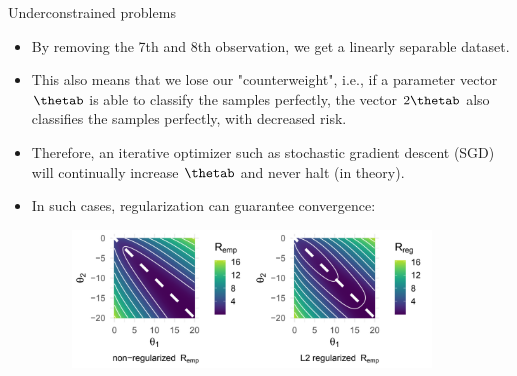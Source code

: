 \begin{vbframe} {Underconstrained problems}
\begin{footnotesize}
\begin{itemize}
\item By removing the 7th and 8th observation, we get a linearly separable dataset. \\
\item This also means that we lose our "counterweight", i.e., if a parameter vector $\thetab$ is able to classify the samples perfectly, the vector $2\thetab$ also classifies the samples perfectly, with decreased risk.
    \item Therefore, an iterative optimizer such as stochastic gradient descent (SGD) will continually increase $\thetab$ and never halt (in theory).
    \item In such cases, regularization can guarantee convergence: 
    
    
\begin{figure}
\includegraphics[width=0.9\textwidth]{figure_man/undercons-problem.png}\\
\end{figure}

    
\end{itemize}
\end{footnotesize}
\end{vbframe}

\endlecture

